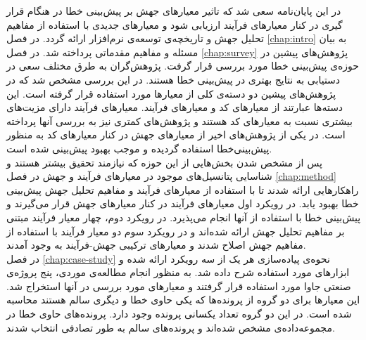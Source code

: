 در این پایان‌نامه سعی شد که تاثیر معیار‌های جهش بر پیش‌بینی خطا در هنگام قرار گیری در کنار معیار‌های فرآیند ارزیابی  شود و معیارهای جدیدی با استفاده از مفاهیم تحلیل جهش و تاریخچه‌ی توسعه‌ی نرم‌افزار ارائه گردد. در فصل \ref{chap:intro} به بیان مسئله و مفاهیم مقدماتی پرداخته شد. در فصل \ref{chap:survey}  پژوهش‌های پیشین در حوزه‌ی پیش‌بینی خطا مورد بررسی قرار گرفت. پژوهش‌گران به طرق مختلف سعی در دستیابی به نتایج بهتری در پیش‌بینی خطا هستند. در این بررسی مشخص شد که در پژوهش‌های پیشین دو دسته‌ی کلی از معیارها مورد استفاده قرار گرفته است. این دسته‌ها عبارتند از معیارهای کد و معیارهای فرآیند. معیارهای فرآیند دارای مزیت‌های بیشتری نسبت به معیارهای کد هستند و پژوهش‌های کمتری نیز به بررسی آنها پرداخته است. در یکی از پژوهش‌های اخیر از معیارهای جهش  در کنار معیارهای کد به منظور پیش‌بینی‌خطا استفاده گردیده و موجب بهبود پیش‌بینی شده است. \\

پس از مشخص شدن بخش‌هایی از این حوزه که نیازمند تحقیق بیشتر هستند و شناسایی پتانسیل‌های موجود در معیارهای فرآیند و جهش در فصل \ref{chap:method} راهکارهایی ارائه شدند تا با استفاده از معیارهای فرآیند و مفاهیم تحلیل جهش پیش‌بینی خطا بهبود یابد. در رویکرد اول معیارهای فرآیند در کنار معیارهای جهش قرار می‌گیرند و پیش‌بینی خطا با استفاده از آنها انجام می‌پذیرد. در رویکرد دوم، چهار معیار فرآیند مبتنی بر مفاهیم تحلیل جهش ارائه شده‌اند و در رویکرد سوم دو معیار فرآیند با استفاده از مفاهیم جهش اصلاح شدند و معیارهای ترکیبی جهش-فرآیند به وجود آمدند. \\

در فصل \ref{chap:case-study}  نحوه‌ی پیاده‌سازی هر یک از سه رویکرد ارائه شده و ابزارهای مورد استفاده شرح داده شد. به منظور انجام مطالعه‌ی موردی، پنج پروژه‌ی صنعتی جاوا مورد استفاده قرار گرفتند و معیارهای مورد بررسی در آنها استخراج شد. این معیارها برای دو گروه از پرونده‌ها که یکی حاوی خطا و دیگری سالم هستند محاسبه شده است. در این دو گروه تعداد یکسانی پرونده وجود دارد. پرونده‌های حاوی خطا در مجموعه‌داده‌ی  مشخص شده‌اند و پرونده‌های سالم به طور تصادفی انتخاب شدند. \\

